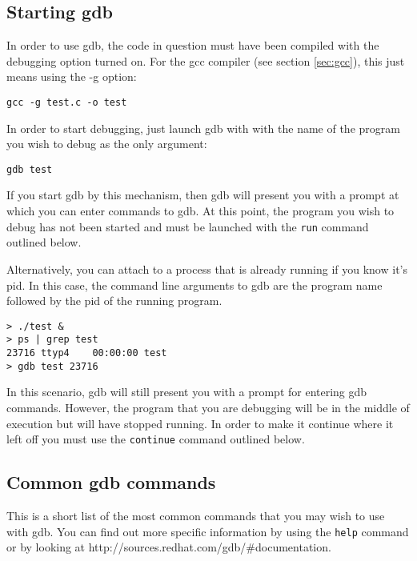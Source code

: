 \documentclass[11pt, letterpaper]{article}
\begin{document}
\subsection{Starting gdb}

In order to use gdb, the code in question must have been compiled with
the debugging option turned on.  For the gcc compiler (see section
\ref{sec:gcc}), this just means using the -g option:

\begin{verbatim}
gcc -g test.c -o test
\end{verbatim}

In order to start debugging, just launch gdb with with the name of the
program you wish to debug as the only argument:

\begin{verbatim}
gdb test
\end{verbatim}

If you start gdb by this mechanism, then gdb will present you with a
prompt at which you can enter commands to gdb.  At this point, the
program you wish to debug has not been started and must be launched with
the {\tt run} command outlined below.

Alternatively, you can attach to a process that is already running if
you know it's pid.  In this case, the command line arguments to gdb are
the program name followed by the pid of the running program.

\begin{verbatim}
> ./test &
> ps | grep test
23716 ttyp4    00:00:00 test
> gdb test 23716
\end{verbatim}

In this scenario, gdb will still present you with a prompt for entering
gdb commands.  However, the program that you are debugging will be in
the middle of execution but will have stopped running.  In order to make
it continue where it left off you must use the {\tt continue} command
outlined below.

\subsection{Common gdb commands}

This is a short list of the most common commands that you may wish to use with
gdb.  You can find out more specific information by using the {\tt help}
command or by looking at http://sources.redhat.com/gdb/\#documentation.
\end{document}
